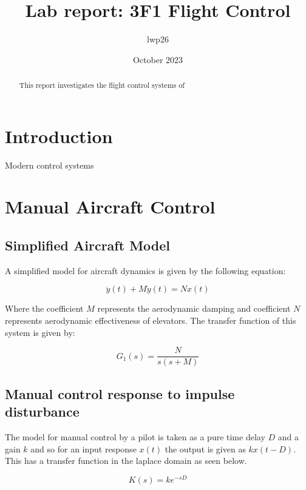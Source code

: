 \documentclass[8pt]{article}
\begin{document}

\title{Lab report: 3F1 Flight Control}
\author{lwp26}
\date{October 2023}
\maketitle

\begin{abstract}
    \centering
    This report investigates the flight control systems of 
\end{abstract}

\newpage

\section{Introduction}

Modern control systems

\section{Manual Aircraft Control}

\subsection{Simplified Aircraft Model}

A simplified model for aircraft dynamics is given by the following equation:

\[
 \ddot{y}(t) + M\dot{y}(t) = Nx(t)
\]

Where the coefficient $M$ represents the aerodynamic damping and coefficient $N$ represents aerodynamic effectiveness of elevators.
The transfer function of this system is given by:

\begin{equation}
    G_1(s) = \frac{N}{s(s + M)}
\end{equation}

\subsection{Manual control response to impulse disturbance}

The model for manual control by a pilot is taken as a pure time delay $D$ and a gain $k$ and so for an input response $x(t)$ the output is given as $kx(t-D)$. This has a transfer function in the laplace domain as seen below.

\begin{equation}
    K(s) = ke^{-sD}
\end{equation}
\end{document}
